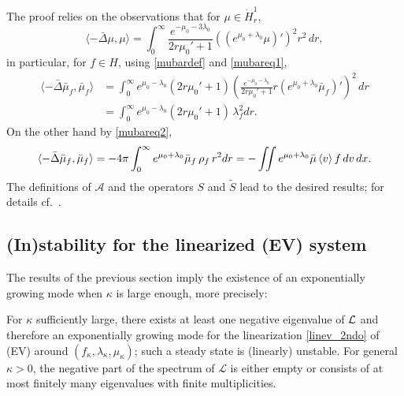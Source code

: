 \documentclass[11pt]{article}
\begin{document}
The proof relies on the observations that for $\mu\in \dot H^1_r$,
\[ 
\langle-\bar \Delta \mu,\mu\rangle
= \int_0^\infty
\frac{e^{-\mu_0-3 \lambda_0}}{2r\mu_0'+1}
\left(\left(e^{\mu_0+\lambda_0} \mu\right)'\right)^2 r^2 \,dr,
\]
in particular, for $f\in H$,
using \eqref{mubardef} and \eqref{mubareq1},
\begin{align*} 
  \langle-\bar \Delta \bar\mu_f,\bar\mu_f\rangle
  &=
  \int_0^\infty
  e^{\mu_0-\lambda_0} \left(2r\mu_0'+1\right)
  \left(\frac{e^{-\mu_0-\lambda_0}}{2r\mu_0'+1} r
  \left(e^{\mu_0+\lambda_0} \bar\mu_f\right)'\right)^2  \,dr \\
  &=
  \int_0^\infty e^{\mu_0-\lambda_0} \left(2r\mu_0'+1\right)\, \lambda_f^2 dr.
\end{align*}
On the other hand by \eqref{mubareq2},
\[
\langle-\bar \Delta \bar\mu_f,\bar\mu_f\rangle
=
- 4\pi \int_0^\infty e^{\mu_0+\lambda_0} \bar\mu_f\, \rho_f\, r^2 dr
= -\iint e^{\mu_0+\lambda_0} \bar\mu \left\langle v\right\rangle f \,dv\,dx.
\]
The definitions of ${\mathcal A}$ and the operators $S$
and $\tilde S$ lead to the desired results; for details
cf.~\cite[Theorem~4.24]{HaLinRe}.
%
\subsection{(In)stability for the linearized (EV) system}
%
The results of the previous section imply the existence of an exponentially
growing mode when $\kappa$ is large enough, more precisely:
%
%
\begin{theorem}\label{gromo_thm}
  For $\kappa$ sufficiently large, there
  exists at least one negative eigenvalue of ${\cal L}$ and therefore an
  exponentially growing mode
  for the linearization \eqref{linev_2ndo} of (EV) around
  $(f_\kappa, \lambda_\kappa,\mu_\kappa)$; such a steady state is (linearly)
  unstable.  For general $\kappa>0$,
  the negative part of the spectrum of
  $\mathcal L$
  is either empty or consists of at most finitely many eigenvalues
  with finite multiplicities. 
\end{theorem}
\end{document}
